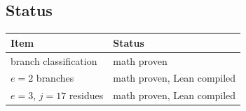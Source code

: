 \subsection{Status}

\begin{center}
\small
\begin{tabular}{@{}p{}p{}@{}}
\toprule
Item & Status \\
\midrule
branch classification & math proven \\
$e=2$ branches & math proven, Lean compiled \\
$e=3$, $j=17$ residues & math proven, Lean compiled \\
\bottomrule
\end{tabular}
\end{center}
